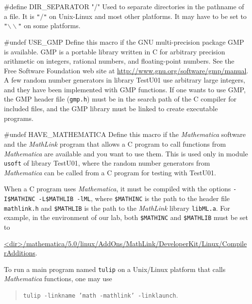 #define DIR_SEPARATOR "/"
\endcode
  \tab Used to separate directories in the pathname of a file.
  It is \texttt{"$/$"} on {Unix-Linux} and most other platforms.
  It may have to be set to \texttt{"$\backslash\backslash$"} on some platforms.
 \endtab
\code


#undef USE_GMP
\endcode
  \tab  Define this macro if the GNU multi-precision package GMP
  is available.  GMP is a portable library written in C for arbitrary
  precision arithmetic on integers, rational numbers, and floating-point
  numbers. See the Free Software Foundation web site at
  \url{http://www.gnu.org/software/gmp/manual}. A few random number
  generators in library TestU01 use arbitrary large integers, and they
  have been implemented with GMP functions. If one wants to use GMP, the
  GMP header file (\texttt{gmp.h}) must be in the  search path
  of the C compiler for included files, and the GMP library must be
  linked to create executable programs.
 \endtab
\code


#undef HAVE_MATHEMATICA
\endcode
  \tab  Define this macro if the {\em Mathematica\/}
    software \cite{mWOL96a}
   and the {\em MathLink} program that allows a C program to call
   functions from {\em Mathematica} are available and you want to use them.
   This is used only in module \texttt{usoft}
   of library TestU01, where the random number generators from
   {\em Mathematica} can be called from a C program for testing with TestU01.

   When a C program uses {\em Mathematica}, it must be compiled with the
    options
   \texttt{-I\$MATHINC -L\$MATHLIB -lML}, where
   \texttt{\$MATHINC} is the path to the header file \texttt{mathlink.h} and
   \texttt{\$MATHLIB} is the path to the {\em MathLink\/} library \texttt{libML.a}.
   For example, in the environment of our lab, both
   \texttt{\$MATHINC} and \texttt{\$MATHLIB} must be set to

   \url{<dir>/mathematica/5.0/linux/AddOns/MathLink/DeveloperKit/Linux/CompilerAdditions}.

  To run a main program named \texttt{tulip} on a Unix/Linux platform
  that calls {\em  Mathematica} functions, one may use
 \begin{verse}
  \texttt{tulip -linkname 'math -mathlink' -linklaunch}.
 \end{verse}
  \endtab


